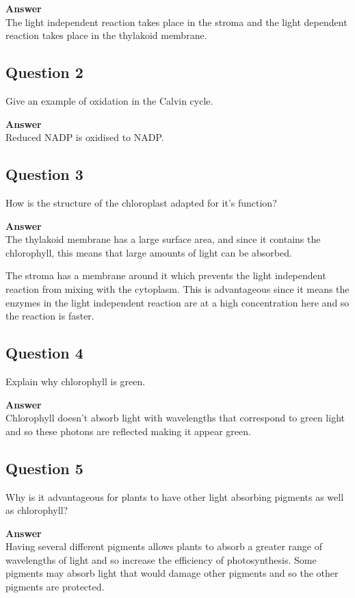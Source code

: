 \documentclass{article}
\begin{document}
\textbf{Answer}\\
The light independent reaction takes place in the stroma and the light dependent reaction takes place in the thylakoid membrane.

\subsection*{Question 2}
Give an example of oxidation in the Calvin cycle.

\textbf{Answer}\\
Reduced NADP is oxidised to NADP.

\subsection*{Question 3}
How is the structure of the chloroplast adapted for it's function?

\textbf{Answer}\\
The thylakoid membrane has a large surface area, and since it contains the chlorophyll, this means that large amounts of light can be absorbed.

The stroma has a membrane around it which prevents the light independent reaction from mixing with the cytoplasm. This is advantageous since it means the enzymes in the light independent reaction are at a high concentration here and so the reaction is faster.

\subsection*{Question 4}
Explain why chlorophyll is green.

\textbf{Answer}\\
Chlorophyll doesn't absorb light with wavelengths that correspond to green light and so these photons are reflected making it appear green.

\subsection*{Question 5}
Why is it advantageous for plants to have other light absorbing pigments as well as chlorophyll?

\textbf{Answer}\\
Having several different pigments allows plants to absorb a greater range of wavelengths of light and so increase the efficiency of photosynthesis. Some pigments may absorb light that would damage other pigments and so the other pigments are protected.
\end{document}
